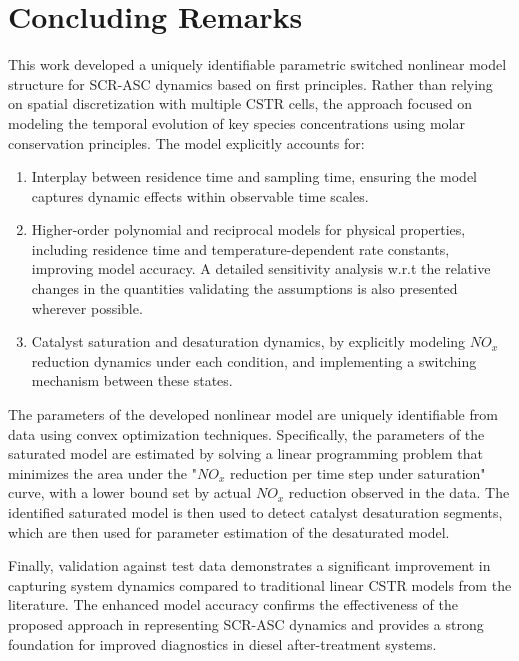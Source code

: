 \newpage
\section{Concluding Remarks}
This work developed a uniquely identifiable parametric switched nonlinear model structure for SCR-ASC dynamics based on
first principles. Rather than relying on spatial discretization with multiple CSTR cells, the approach focused on modeling the temporal evolution of key species concentrations using molar conservation principles. The model explicitly accounts for:

\begin{enumerate}
        \item Interplay between residence time and sampling time, ensuring the model captures dynamic effects within observable time scales.
        \item Higher-order polynomial and reciprocal models for physical properties, including residence time and temperature-dependent rate constants, improving model accuracy. A detailed sensitivity analysis w.r.t the relative changes in the quantities validating the assumptions is also presented wherever possible.
        \item Catalyst saturation and desaturation dynamics, by explicitly modeling $NO_x$ reduction dynamics under each condition, and implementing a switching mechanism between these states.
\end{enumerate}

The parameters of the developed nonlinear model are uniquely identifiable from data using convex optimization
techniques. Specifically, the parameters of the saturated model are estimated by solving a linear programming problem
that minimizes the area under the "$NO_x$ reduction per time step under saturation" curve, with a lower bound set by
actual $NO_x$ reduction observed in the data. The identified saturated model is then used to detect catalyst
desaturation segments, which are then used for parameter estimation of the desaturated model.

Finally, validation against test data demonstrates a significant improvement in capturing system dynamics compared to
traditional linear CSTR models from the literature. The enhanced model accuracy confirms the effectiveness of the
proposed approach in representing SCR-ASC dynamics and provides a strong foundation for improved diagnostics in diesel
after-treatment systems.

